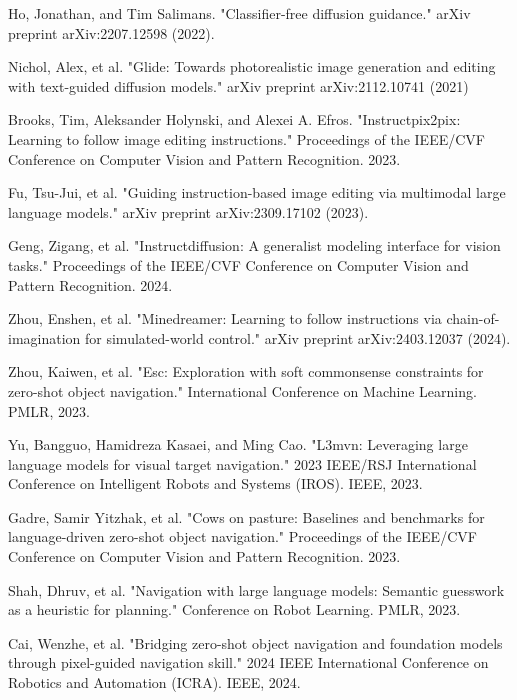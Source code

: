\begin{thebibliography}{99}
 Ho, Jonathan, and Tim Salimans. "Classifier-free diffusion guidance." arXiv preprint arXiv:2207.12598 (2022).

 Nichol, Alex, et al. "Glide: Towards photorealistic image generation and editing with text-guided diffusion models." arXiv preprint arXiv:2112.10741 (2021)

 Brooks, Tim, Aleksander Holynski, and Alexei A. Efros. "Instructpix2pix: Learning to follow image editing instructions." Proceedings of the IEEE/CVF Conference on Computer Vision and Pattern Recognition. 2023.

 Fu, Tsu-Jui, et al. "Guiding instruction-based image editing via multimodal large language models." arXiv preprint arXiv:2309.17102 (2023).

 Geng, Zigang, et al. "Instructdiffusion: A generalist modeling interface for vision tasks." Proceedings of the IEEE/CVF Conference on Computer Vision and Pattern Recognition. 2024.

 Zhou, Enshen, et al. "Minedreamer: Learning to follow instructions via chain-of-imagination for simulated-world control." arXiv preprint arXiv:2403.12037 (2024).

 Zhou, Kaiwen, et al. "Esc: Exploration with soft commonsense constraints for zero-shot object navigation." International Conference on Machine Learning. PMLR, 2023.

 Yu, Bangguo, Hamidreza Kasaei, and Ming Cao. "L3mvn: Leveraging large language models for visual target navigation." 2023 IEEE/RSJ International Conference on Intelligent Robots and Systems (IROS). IEEE, 2023.

 Gadre, Samir Yitzhak, et al. "Cows on pasture: Baselines and benchmarks for language-driven zero-shot object navigation." Proceedings of the IEEE/CVF Conference on Computer Vision and Pattern Recognition. 2023.

 Shah, Dhruv, et al. "Navigation with large language models: Semantic guesswork as a heuristic for planning." Conference on Robot Learning. PMLR, 2023.

 Cai, Wenzhe, et al. "Bridging zero-shot object navigation and foundation models through pixel-guided navigation skill." 2024 IEEE International Conference on Robotics and Automation (ICRA). IEEE, 2024.


\end{thebibliography}
